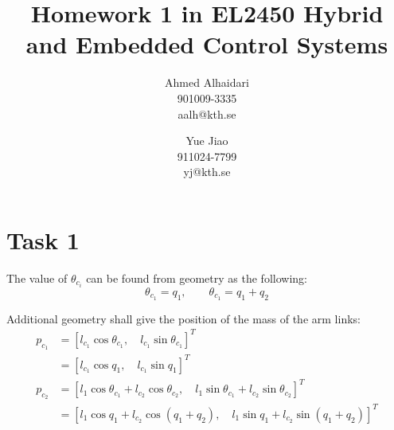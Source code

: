 \documentclass[a4paper,12pt,oneside,onecolumn]{article} %
\begin{document}

\title{Homework 1 in EL2450 Hybrid and Embedded Control Systems}
\author{
  Ahmed Alhaidari \\ 901009-3335 \\ aalh@kth.se 
  \and 
  Yue Jiao \\ 911024-7799 \\ yj@kth.se
  }

\maketitle                     %



\section*{Task 1}
The value of $\theta_{c_i}$ can be found from geometry as the following: 
\begin{equation}
    \theta_{c_1} = q_1 , \qquad \theta_{c_1} = q_1 + q_2
\end{equation}

Additional geometry shall give the position of the mass of the arm links: 
\begin{equation}
    \begin{aligned}
        p_{c_1} & = [l_{c_1}  \cos{\theta_{c_1}}, \quad l_{c_1}  \sin{\theta_{c_1}}]^T \\ 
                & = [l_{c_1}  \cos{q_1}, \quad l_{c_1}  \sin{q_1}]^T \\
        p_{c_2} & = [l_1  \cos{\theta_{c_1}} + l_{c_2}   \cos{\theta_{c_2}}, \quad    l_1  \sin{\theta_{c_1}} +  l_{c_2}   \sin{\theta_{c_2}}]^T \\ 
                & = [l_1  \cos{q_1} + l_{c_2}   \cos{(q_1+q_2)}, \quad l_1  \sin{q_1} +  l_{c_2}   \sin{(q_1+q_2)}]^T 
    \end{aligned}
\end{equation}
\end{document}
